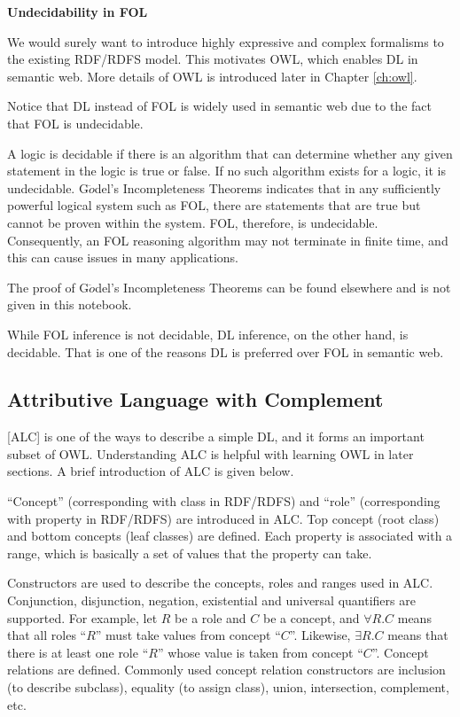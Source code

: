 \begin{mdframed}
	
\noindent \textbf{Undecidability in FOL}

We would surely want to introduce highly expressive and complex formalisms to the existing RDF/RDFS model. This motivates OWL, which enables DL in semantic web. More details of OWL is introduced later in Chapter \ref{ch:owl}. 

Notice that DL instead of FOL is widely used in semantic web due to the fact that FOL is undecidable.

A logic is decidable if there is an algorithm that can determine whether any given statement in the logic is true or false. If no such algorithm exists for a logic, it is undecidable. G$\ddot{o}$del's Incompleteness Theorems indicates that in any sufficiently powerful logical system such as FOL, there are statements that are true but cannot be proven within the system. FOL, therefore, is undecidable. Consequently, an FOL reasoning algorithm may not terminate in finite time, and this can cause issues in many applications.

The proof of G$\ddot{o}$del's Incompleteness Theorems can be found elsewhere and is not given in this notebook.

While FOL inference is not decidable, DL inference, on the other hand, is decidable. That is one of the reasons DL is preferred over FOL in semantic web.
	
\end{mdframed}

\subsection{Attributive Language with Complement}

[ALC] is one of the ways to describe a simple DL, and it forms an important subset of OWL. Understanding ALC is helpful with learning OWL in later sections. A brief introduction of ALC is given below.

``Concept'' (corresponding with class in RDF/RDFS) and ``role'' (corresponding with property in RDF/RDFS) are introduced in ALC. Top concept (root class) and bottom concepts (leaf classes) are defined. Each property is associated with a range, which is basically a set of values that the property can take.

Constructors are used to describe the concepts, roles and ranges used in ALC. Conjunction, disjunction, negation, existential and universal quantifiers are supported. For example, let $R$ be a role and $C$ be a concept, and $\forall R.C$ means that all roles ``$R$'' must take values from concept ``$C$''. Likewise, $\exists R.C$ means that there is at least one role ``$R$'' whose value is taken from concept ``$C$''. Concept relations are defined. Commonly used concept relation constructors are inclusion (to describe subclass), equality (to assign class), union, intersection, complement, etc.

